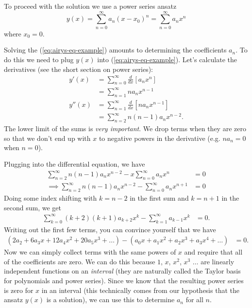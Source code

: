 \documentclass[11pt, letterpaper, oneside]{article}     %
\numberwithin{equation}{subsection}
\theoremstyle{definition}
\numberwithin{theorem}{section}
\theoremstyle{remark}
\begin{document}
\begin{enumerate}
  To proceed with the solution we use a power series ansatz
  \begin{equation}
    y(x) = \sum_{n=0}^\infty a_n(x-x_0)^n = \sum_{n=0}^\infty a_nx^n
  \end{equation}
  where $x_0 = 0$.

  Solving the (\ref{eq:airys-eq-example}) amounts to determining the coefficients $a_n$. To do this we need to plug $y(x)$ into (\ref{eq:airys-eq-example}). Let's calculate the derivatives (see the short section on power series):
  \begin{align}
    y'(x) &= \sum_{n=0}^\infty \frac{d}{dx}\left[a_nx^n\right]\\
    &= \sum_{n=1}^\infty na_nx^{n-1}\\
    y''(x) &= \sum_{n=1}^\infty \frac{d}{dx}\left[na_nx^{n-1}\right]\\
    &= \sum_{n=2}^\infty n(n-1)a_nx^{n-2}.
  \end{align}
  The lower limit of the sums is \emph{very important}. We drop terms when they are zero so that we don't end up with $x$ to negative powers in the derivative (e.g. $na_n = 0$ when $n=0$).

  Plugging into the differential equation, we have
  \begin{align}
    \sum_{n=2}^\infty n(n-1)a_nx^{n-2} - x\sum_{n=0}^\infty a_nx^n &= 0\\
    \implies\sum_{n=2}^\infty n(n-1)a_nx^{n-2} - \sum_{n=0}^\infty a_nx^{n+1} &= 0
  \end{align}
  Doing some index shifting with $k = n-2$ in the first sum and $k = n+1$ in the second sum, we get
  \begin{align}\label{eq:airys-power-series}
    \sum_{k=0}^\infty (k+2)(k+1)a_{k+2}x^k - \sum_{k=1}^\infty a_{k-1}x^k &= 0.
  \end{align}
  Writing out the first few terms, you can convince yourself that we have
  \begin{align}\label{eq:expansion-of-airys-equation}
    (2a_2 + 6a_3x + 12a_4x^2 + 20a_5x^3 + \dots) - (a_0x + a_1x^2 + a_2x^3 + a_3x^4 + \dots) &= 0.
  \end{align}
  Now we can simply collect terms with the same powers of $x$ and require that all of the coefficients are zero. We can do this because $1$, $x$, $x^2$, $x^3$ $\dots$ are linearly independent functions on an \emph{interval} (they are naturally called the Taylor basis for polynomials and power series). Since we know that the resulting power series is zero for $x$ in an interval (this technically comes from our hypothesis that the ansatz $y(x)$ is a solution), we can use this to determine $a_n$ for all $n$.


\end{enumerate}
\end{document}

